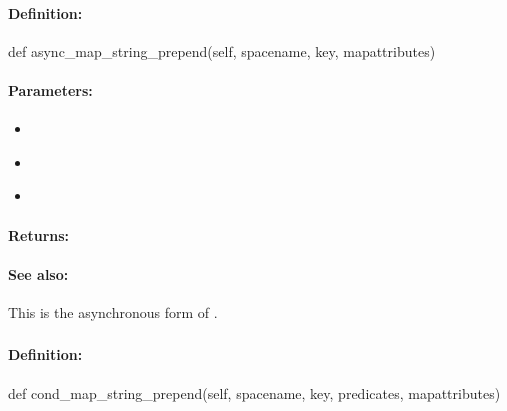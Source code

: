 \paragraph{Definition:}
\begin{pythoncode}
def async_map_string_prepend(self, spacename, key, mapattributes)
\end{pythoncode}

\paragraph{Parameters:}
\begin{itemize}[noitemsep]
\item {}\\

\item {}\\

\item {}\\

\end{itemize}

\paragraph{Returns:}


\paragraph{See also:}  This is the asynchronous form of .

\pagebreak
\subsubsection{}
\label{api:python:cond_map_string_prepend}


\paragraph{Definition:}
\begin{pythoncode}
def cond_map_string_prepend(self, spacename, key, predicates, mapattributes)
\end{pythoncode}

